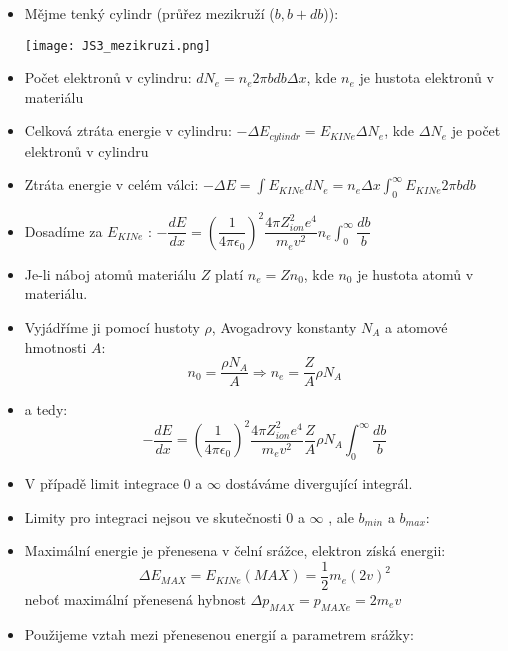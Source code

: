 \documentclass[../../main.tex]{subfiles}
\begin{document}
\begin{itemize}
	\item Mějme tenký cylindr (průřez mezikruží ($b, b + db$)):
	\begin{center}
		\texttt{[image: JS3\_mezikruzi.png]}
	\end{center}
	
	\item Počet elektronů v cylindru: $dN_e = n_e 2 \pi b db \Delta x$,
	kde $n_e$ je hustota elektronů v materiálu
	\item Celková ztráta energie v cylindru: $- \Delta E_{cylindr}  = E_{KINe} \Delta N_e$, kde $\Delta N_e$ je počet elektronů v cylindru
	\item Ztráta energie v celém válci: $- \Delta E = \int E_{KINe} dN_e = n_e \Delta x \int_{0}^{\infty} E_{KINe} 2 \pi b db $
	\item Dosadíme za $E_{KINe}$ : $- \dfrac{dE}{dx} = \left( \dfrac{1}{4 \pi \epsilon_0} \right) ^2\dfrac{4 \pi Z_{ion}^{2} e^4}{m_e v^2} n_e \int_{0}^{\infty} \dfrac{db}{b} $
	\item Je-li náboj atomů materiálu $Z$ platí $n_e = Z n_0$, kde $n_0$ je hustota atomů v materiálu.
	\item Vyjádříme ji pomocí hustoty $\rho$, Avogadrovy konstanty $N_A$ a atomové hmotnosti $A$:
	\begin{equation}
	n_0 = \dfrac{\rho N_A}{A} \Rightarrow n_e = \dfrac{Z}{A} \rho N_A
	\end{equation}
	\item a tedy:
	\begin{equation}
	- \dfrac{dE}{dx} = \left( \dfrac{1}{4 \pi \epsilon_0} \right) ^2 \dfrac{4 \pi Z_{ion}^2 e^4}{m_e v^2} \dfrac{Z}{A} \rho N_A \int_{0}^{\infty} \dfrac{db}{b}
	\end{equation}
	\item V případě limit integrace $0$ a $\infty$  dostáváme divergující integrál.
	\item Limity pro integraci nejsou ve skutečnosti $0$ a $\infty$ , ale $b_{min}$ a $b_{max}$:
	\item Maximální energie je přenesena v čelní srážce, elektron získá energii:
	\begin{equation}
	\Delta E_{MAX} = E_{KINe} (MAX) = \dfrac{1}{2} m_e (2 v)^2
	\end{equation}	
	neboť maximální přenesená hybnost $\Delta p_{MAX} = p_{MAXe} = 2 m_e v$
	\item Použijeme vztah mezi přenesenou energií a parametrem srážky:

\end{itemize}
\end{document}
